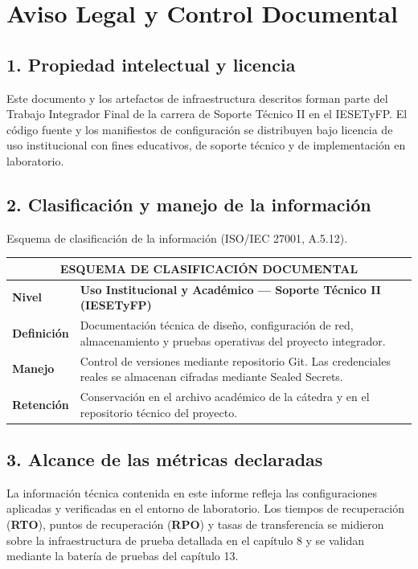 \documentclass[10pt,a4paper]{article}
\begin{document}
\vspace{0.3cm}
\section*{Aviso Legal y Control Documental}

\subsection*{1. Propiedad intelectual y licencia}
Este documento y los artefactos de infraestructura descritos forman parte del Trabajo Integrador Final de la carrera de Soporte Técnico II en el IESETyFP. El código fuente y los manifiestos de configuración se distribuyen bajo licencia de uso institucional con fines educativos, de soporte técnico y de implementación en laboratorio.

\subsection*{2. Clasificación y manejo de la información}
Esquema de clasificación de la información (ISO/IEC 27001, A.5.12).

\begin{table}[htbp]
\centering
\small
\begin{tabular}{|p{3cm}|p{13.2cm}|}
\hline
\multicolumn{2}{|c|}{\textbf{\textsf{ESQUEMA DE CLASIFICACIÓN DOCUMENTAL}}} \\
\hline
\textbf{\textsf{Nivel}} & \textbf{Uso Institucional y Académico — Soporte Técnico II (IESETyFP)} \\
\hline
\textbf{\textsf{Definición}} & Documentación técnica de diseño, configuración de red, almacenamiento y pruebas operativas del proyecto integrador. \\
\hline
\textbf{\textsf{Manejo}} & Control de versiones mediante repositorio Git. Las credenciales reales se almacenan cifradas mediante Sealed Secrets. \\
\hline
\textbf{\textsf{Retención}} & Conservación en el archivo académico de la cátedra y en el repositorio técnico del proyecto. \\
\hline
\end{tabular}
\end{table}

\newpage
\subsection*{3. Alcance de las métricas declaradas}
La información técnica contenida en este informe refleja las configuraciones aplicadas y verificadas en el entorno de laboratorio. Los tiempos de recuperación (\textbf{RTO}), puntos de recuperación (\textbf{RPO}) y tasas de transferencia se midieron sobre la infraestructura de prueba detallada en el capítulo 8 y se validan mediante la batería de pruebas del capítulo 13.
\end{document}
